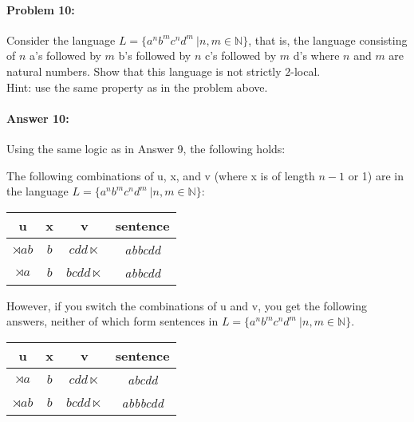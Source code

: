 \documentclass[10pt]{article}
\begin{document}
\paragraph{Problem 10:}

Consider the language
$L= \{a^n b^m c^n d^m\ | n, m \in \mathbb{N} \}$, that is, the
language consisting of $n$ a's followed by $m$ b's followed by $n$ c's
followed by $m$ d's where $n$ and $m$ are
natural numbers. Show that this language is not strictly $2$-local.\\

\noindent Hint: use the same property as in the problem above.

\paragraph{Answer 10:} Using the same logic as in Answer 9, the following holds:

\noindent The following combinations of u, x, and v (where x is of length $n-1$ or 1) are in the language $L= \{a^n b^m c^n d^m\ | n, m \in \mathbb{N} \}$:

\begin{center}
    \begin{tabular}{| c | c | c | c |}
        \hline
         \textbf{u} & \textbf{x} & \textbf{v} & \textbf{sentence}\\
         \hline
         $\rtimes a b$ & $b$ & $c d d \ltimes$ & \textit{abbcdd}\\
         \hline 
         $\rtimes a$ & $b$ & $b c d d \ltimes$ & \textit{abbcdd}\\
         \hline
    \end{tabular}
\end{center}

\noindent However, if you switch the combinations of u and v, you get the following answers, neither of which form sentences in $L= \{a^n b^m c^n d^m\ | n, m \in \mathbb{N} \}$.

\begin{center}
    \begin{tabular}{| c | c | c | c |}
        \hline
         \textbf{u} & \textbf{x} & \textbf{v} & \textbf{sentence}\\
         \hline
         $\rtimes a$ & $b$ & $c d d \ltimes$ & \textit{abcdd}\\
         \hline 
         $\rtimes a b$ & $b$ & $b c d d \ltimes$ & \textit{abbbcdd}\\
         \hline
    \end{tabular}
\end{center}
\end{document}
